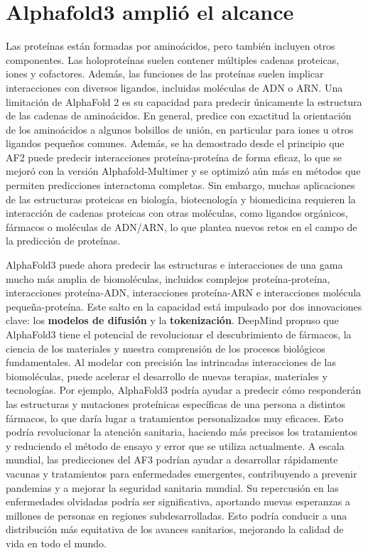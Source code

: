 \section{Alphafold3 amplió el alcance}
Las proteínas están formadas por aminoácidos, pero también incluyen otros componentes. Las holoproteínas suelen contener múltiples cadenas proteicas, iones y cofactores. Además, las funciones de las proteínas suelen implicar interacciones con diversos ligandos, incluidas moléculas de ADN o ARN. Una limitación de AlphaFold 2 es su capacidad para predecir únicamente la estructura de las cadenas de aminoácidos. En general, predice con exactitud la orientación de los aminoácidos a algunos bolsillos de unión, en particular para iones u otros ligandos pequeños comunes. Además, se ha demostrado desde el principio que AF2 puede predecir interacciones proteína-proteína de forma eficaz, lo que se mejoró con la versión Alphafold-Multimer y se optimizó aún más en métodos que permiten predicciones interactoma completas. Sin embargo, muchas aplicaciones de las estructuras proteicas en biología, biotecnología y biomedicina requieren la interacción de cadenas proteicas con otras moléculas, como ligandos orgánicos, fármacos o moléculas de ADN/ARN, lo que plantea nuevos retos en el campo de la predicción de proteínas.

AlphaFold3 puede ahora predecir las estructuras e interacciones de una gama mucho más amplia de biomoléculas, incluidos complejos proteína-proteína, interacciones proteína-ADN, interacciones proteína-ARN e interacciones molécula pequeña-proteína. Este salto en la capacidad está impulsado por dos innovaciones clave: los \textbf{modelos de difusión} y la \textbf{tokenización}. DeepMind propuso que AlphaFold3 tiene el potencial de revolucionar el descubrimiento de fármacos, la ciencia de los materiales y nuestra comprensión de los procesos biológicos fundamentales. Al modelar con precisión las intrincadas interacciones de las biomoléculas, puede acelerar el desarrollo de nuevas terapias, materiales y tecnologías. Por ejemplo, AlphaFold3 podría ayudar a predecir cómo responderán las estructuras y mutaciones proteínicas específicas de una persona a distintos fármacos, lo que daría lugar a tratamientos personalizados muy eficaces. Esto podría revolucionar la atención sanitaria, haciendo más precisos los tratamientos y reduciendo el método de ensayo y error que se utiliza actualmente. A escala mundial, las predicciones del AF3 podrían ayudar a desarrollar rápidamente vacunas y tratamientos para enfermedades emergentes, contribuyendo a prevenir pandemias y a mejorar la seguridad sanitaria mundial. Su repercusión en las enfermedades olvidadas podría ser significativa, aportando nuevas esperanzas a millones de personas en regiones subdesarrolladas. Esto podría conducir a una distribución más equitativa de los avances sanitarios, mejorando la calidad de vida en todo el mundo. 

